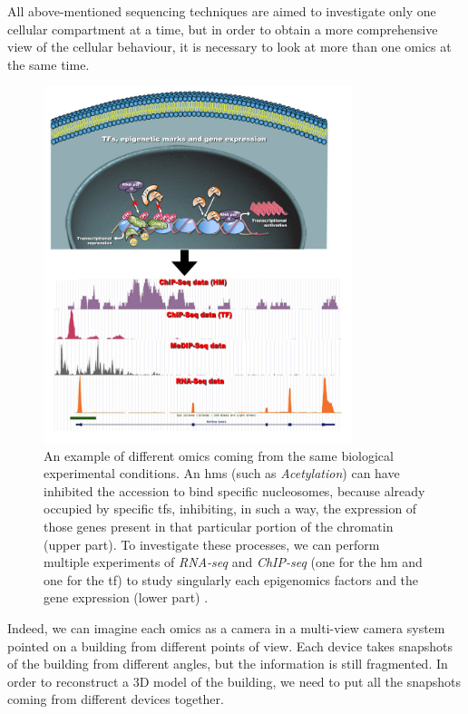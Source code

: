 All above-mentioned sequencing techniques are aimed to investigate only one cellular compartment at a time, but in order to obtain a more comprehensive view of the cellular behaviour, it is necessary to look at more than one omics at the same time.

\begin{figure}[H]
\centering
\includegraphics[width=9cm, keepaspectratio]{img/intro/multiomicsex.png}
\caption[Multi-Omics Representation]{An example of different omics coming from the same biological experimental conditions. 
An \glspl{hm} (such as \textit{Acetylation}) can have inhibited the accession to bind specific nucleosomes, because already occupied by specific \glspl{tf}, inhibiting, in such a way, the expression of those genes present in that particular portion of the chromatin (upper part).
To investigate these processes, we can perform multiple experiments of \textit{RNA-seq} and \textit{ChIP-seq} (one for the \gls{hm} and one for the \gls{tf}) to study singularly each epigenomics factors and the gene expression (lower part) \cite{Angelini2014c}.}
\label{fig:omics}
\end{figure}

Indeed, we can imagine each omics as a camera in a multi-view camera system pointed on a building from different points of view.
Each device takes snapshots of the building from different angles, but the information is still fragmented.
In order to reconstruct a 3D model of the building, we need to put all the snapshots coming from different devices together.

